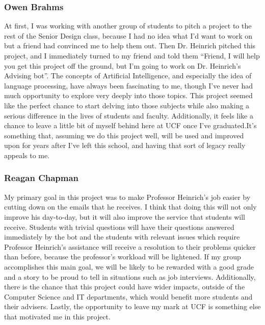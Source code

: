\documentclass[titlepage, 12pt]{article}
\begin{document}
\subsubsection{Owen Brahms}

At first, I was working with another group of students to pitch a project to the rest of the Senior Design class, because I had no idea what I’d want to work on but a friend had convinced me to help them out. Then Dr. Heinrich pitched this project, and I immediately turned to my friend and told them “Friend, I will help you get this project off the ground, but I’m going to work on Dr. Heinrich’s Advising bot”. The concepts of Artificial Intelligence, and especially the idea of language processing, have always been fascinating to me, though I’ve never had much opportunity to explore very deeply into those topics. This project seemed like the perfect chance to start delving into those subjects while also making a serious difference in the lives of students and faculty. Additionally, it feels like a chance to leave a little bit of myself behind here at UCF once I’ve graduated.It’s something that, assuming we do this project well, will be used and improved upon for years after I’ve left this school, and having that sort of legacy really appeals to me.

\subsubsection{Reagan Chapman}

My primary goal in this project was to make Professor Heinrich’s job easier by cutting down on the emails that he receives. I think that doing this will not only improve his day-to-day, but it will also improve the service that students will receive. Students with trivial questions will have their questions answered immediately by the bot and the students with relevant issues which require Professor Heinrich’s assistance will receive a resolution to their problems quicker than before, because the professor’s workload will be lightened. If my group accomplishes this main goal, we will be likely to be rewarded with a good grade and a story to be proud to tell in situations such as job interviews. Additionally, there is the chance that this project could have wider impacts, outside of the Computer Science and IT departments, which would benefit more students and their advisers. Lastly, the opportunity to leave my mark at UCF is something else that motivated me in this project.
\end{document}
